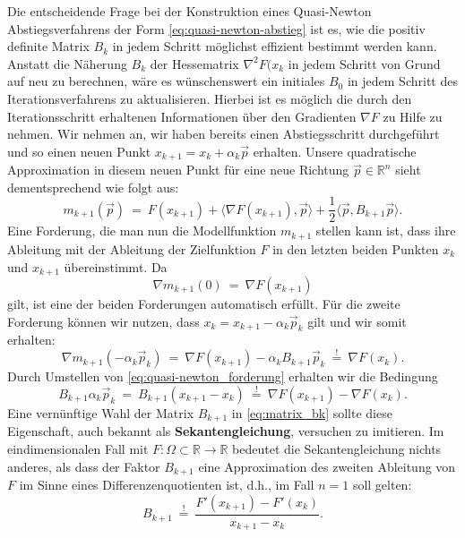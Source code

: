 Die entscheidende Frage bei der Konstruktion eines Quasi-Newton Abstiegsverfahrens der Form \eqref{eq:quasi-newton-abstieg} ist es, wie die positiv definite Matrix $B_k$ in jedem Schritt möglichst effizient bestimmt werden kann. 
Anstatt die Näherung $B_k$ der Hessematrix $\nabla^2 F(x_k$ in jedem Schritt von Grund auf neu zu berechnen, wäre es wünschenswert ein initiales $B_0$ in jedem Schritt des Iterationsverfahrens zu aktualisieren.
Hierbei ist es möglich die durch den Iterationsschritt erhaltenen Informationen über den Gradienten $\nabla F$ zu Hilfe zu nehmen.
Wir nehmen an, wir haben bereits einen Abstiegsschritt durchgeführt und so einen neuen Punkt $x_{k+1} = x_k + \alpha_k\vec{p}$ erhalten.
Unsere quadratische Approximation in diesem neuen Punkt für eine neue Richtung $\vec{p} \in \mathbb{R}^n$ sieht dementsprechend wie folgt aus:
\begin{equation*}
m_{k+1}(\vec{p}) \ = \ F(x_{k+1}) + \langle \nabla F(x_{k+1}), \vec{p} \rangle + \frac{1}{2}\langle \vec{p}, B_{k+1}\vec{p} \rangle.
\end{equation*}
Eine Forderung, die man nun die Modellfunktion $m_{k+1}$ stellen kann ist, dass ihre Ableitung mit der Ableitung der Zielfunktion $F$ in den letzten beiden Punkten $x_k$ und $x_{k+1}$ übereinstimmt.
Da
\begin{equation*}
\nabla m_{k+1}(0) \ = \ \nabla F(x_{k+1})
\end{equation*}
gilt, ist eine der beiden Forderungen automatisch erfüllt.
Für die zweite Forderung können wir nutzen, dass $x_k = x_{k+1} - \alpha_k \vec{p}_k$ gilt und wir somit erhalten:
\begin{equation}
\label{eq:quasi-newton_forderung}
\nabla m_{k+1}(-\alpha_k\vec{p}_k) \ = \ \nabla F(x_{k+1}) - \alpha_k B_{k+1}\vec{p}_k \ \overset{!}{=} \ \nabla F(x_k).
\end{equation}
Durch Umstellen von \eqref{eq:quasi-newton_forderung} erhalten wir die Bedingung
\begin{equation*}
B_{k+1}\alpha_k \vec{p}_k \ = \ B_{k+1}(x_{k+1} - x_k) \ \overset{!}{=} \ \nabla F(x_{k+1}) - \nabla F(x_k).
\end{equation*}
Eine vernünftige Wahl der Matrix $B_{k+1}$ in \eqref{eq:matrix_bk} sollte diese Eigenschaft, auch bekannt als \textbf{Sekantengleichung}, versuchen zu imitieren.
Im eindimensionalen Fall mit $F \colon \Omega \subset \mathbb{R} \rightarrow \mathbb{R}$ bedeutet die Sekantengleichung nichts anderes, als dass der Faktor $B_{k+1}$ eine Approximation des zweiten Ableitung von $F$ im Sinne eines Differenzenquotienten ist, d.h., im Fall $n=1$ soll gelten:
\begin{equation*}
B_{k+1} \ \overset{!}{=} \ \frac{F'(x_{k+1})-F'(x_k)}{x_{k+1} - x_k}.
\end{equation*}

